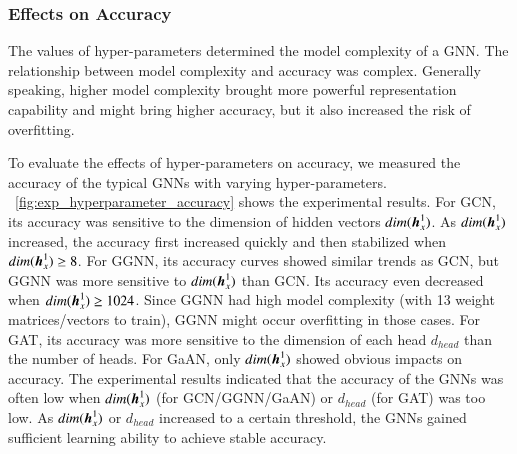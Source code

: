 \subsubsection{Effects on Accuracy}

%
The values of hyper-parameters determined the model complexity of a GNN.
%
The relationship between model complexity and accuracy was complex.
%
%
Generally speaking, higher model complexity brought more powerful representation capability and might bring higher accuracy, but it also increased the risk of overfitting.

To evaluate the effects of hyper-parameters on accuracy, we measured the accuracy of the typical GNNs with varying hyper-parameters.
%
\figurename~\ref{fig:exp_hyperparameter_accuracy} shows the experimental results.
%
For GCN, its accuracy was sensitive to the dimension of hidden vectors $dim(\boldsymbol{h}^1_x)$.
%
As $dim(\boldsymbol{h}^1_x)$ increased, the accuracy first increased quickly and then stabilized when $dim(\boldsymbol{h}_x^1) \geq 8$.
%
For GGNN, its accuracy curves showed similar trends as GCN, but GGNN was more sensitive to $dim(\boldsymbol{h}_x^1)$ than GCN.
%
Its accuracy even decreased when $dim(\boldsymbol{h}_x^1) \geq 1024$.
%
Since GGNN had high model complexity (with 13 weight matrices/vectors to train), GGNN might occur overfitting in those cases.
%
For GAT, its accuracy was more sensitive to the dimension of each head $d_{head}$ than the number of heads.
%
For GaAN, only $dim(\boldsymbol{h}_x^1)$ showed obvious impacts on accuracy.
%
The experimental results indicated that the accuracy of the GNNs was often low when $dim(\boldsymbol{h}_x^1)$ (for GCN/GGNN/GaAN) or $d_{head}$ (for GAT) was too low.
%
%
As $dim(\boldsymbol{h}_x^1)$ or $d_{head}$ increased to a certain threshold, the GNNs gained sufficient learning ability to achieve stable accuracy.

